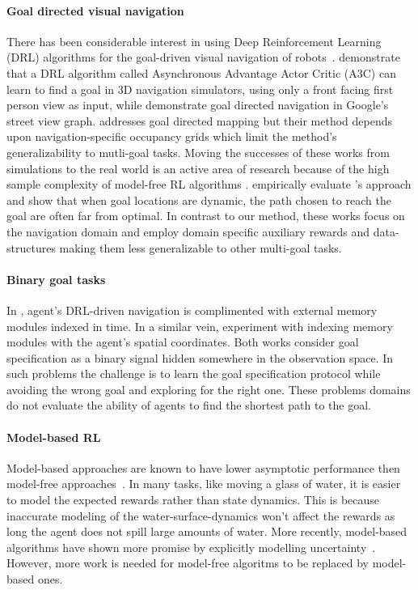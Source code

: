 \paragraph{Goal directed visual navigation}
There has been considerable interest in using Deep Reinforcement
Learning (DRL) algorithms for the goal-driven visual navigation of
robots~\citep{mirowski2016learning,MiPaViICLR2017,dhiman2018critical,gupta2017cognitive,savinov2018semi}.
\cite{mirowski2016learning} demonstrate that a DRL algorithm called
Asynchronous Advantage Actor Critic (A3C) can learn to find a goal in 3D
navigation simulators, using only a front facing first person view as
input, while \cite{MiPaViICLR2017} demonstrate goal directed navigation
in Google's street view graph. \citet{gupta2017cognitive} addresses goal
directed mapping but their method depends upon
navigation-specific occupancy grids which limit the method's
generalizability to mutli-goal tasks. Moving the successes of these
works from simulations to the real world is an active area of research 
because of the high sample complexity of
model-free RL algorithms \citep{zhu2017target,anderson2018vision} . \citet{dhiman2018critical} empirically evaluate
\cite{mirowski2016learning}'s approach and show that when goal locations
are dynamic, the path chosen to reach the goal are often far from
optimal.  In contrast to our method, these works focus on the
navigation domain and employ domain specific auxiliary rewards and
data-structures making them less generalizable to other multi-goal
tasks.

\paragraph{Binary goal tasks}
In \cite{OhChSiICML2016}, agent's DRL-driven navigation is complimented
with external memory modules indexed in time.
In a similar vein, \citet{parisotto2017neural} experiment with indexing
memory modules with the agent's spatial coordinates. Both works 
consider goal specification as a binary signal hidden somewhere in the
observation space. In such problems the challenge is to learn the goal
specification protocol while avoiding the wrong goal and exploring for the right
one. These problems domains do not evaluate the ability of agents to find the
shortest path to the goal.

\paragraph{Model-based RL}
Model-based approaches are known to have lower asymptotic performance then
model-free approaches~\cite{pong2018temporal}. In many tasks, like moving a
glass of water, it is easier to model the expected rewards rather than state
dynamics. This is because inaccurate modeling of the water-surface-dynamics
won't affect the rewards as long the agent does not spill large amounts of
water. More recently, model-based algorithms have shown more promise by
explicitly modelling uncertainty~\cite{lakshminarayanan2017simple,
  kurutach2018model,zhang2018solar}.
However, more work is needed for model-free algoritms to be replaced by
model-based ones. 


